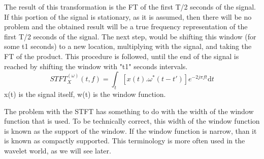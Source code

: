 \documentclass[12pt, a4paper, twoside]{report}
\begin{document}
The result of this transformation is the FT of the first T/2 seconds of the signal. If this portion of the signal is stationary, as it is assumed, then there will be no problem and the obtained result will be a true frequency representation of the first T/2 seconds of the signal. 
The next step, would be shifting this window (for some t1 seconds) to a new location, multiplying with the signal, and taking the FT of the product. This procedure is followed, until the end of the signal is reached by shifting the window with "t1" seconds intervals.
\begin{equation*}
STFT^{(\omega)}_{X}(t, f) = \int_{t}\left [ x(t) . \omega^{*}(t-t')  \right ] e^{-2j\pi ft} \text{d}t
\end{equation*}
x(t) is the signal itself, w(t) is the window function.
\par
The problem with the STFT has something to do with the width of the window function that is used. To be technically correct, this width of the window function is known as the support of the window. If the window function is narrow, than it is known as compactly supported. This terminology is more often used in the wavelet world, as we will see later.
\end{document}
